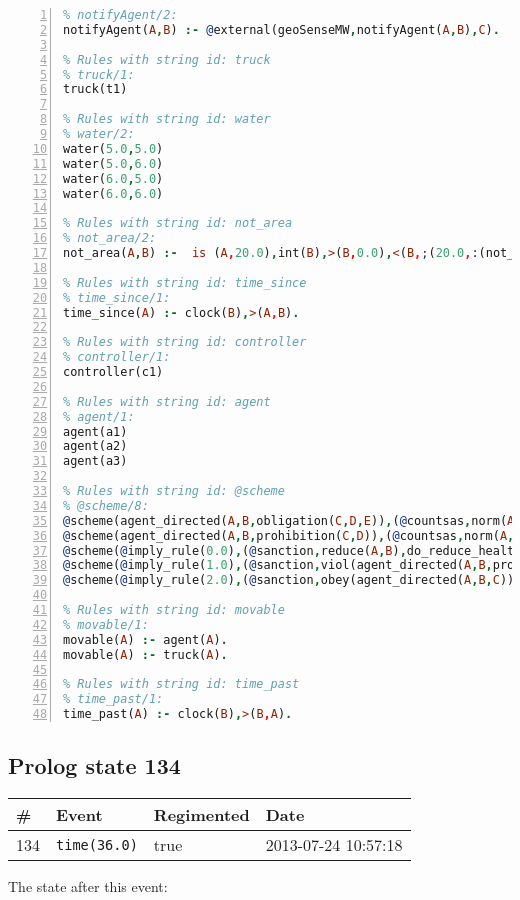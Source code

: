 \documentclass[11pt]{article}\usepackage[utf8]{inputenc}\usepackage{geometry}
\begin{document}
\begin{lstlisting}[language=Prolog, numbers=left]
% Rules with string id: notifyAgent
% notifyAgent/2:
notifyAgent(A,B) :- @external(geoSenseMW,notifyAgent(A,B),C).

% Rules with string id: truck
% truck/1:
truck(t1)

% Rules with string id: water
% water/2:
water(5.0,5.0)
water(5.0,6.0)
water(6.0,5.0)
water(6.0,6.0)

% Rules with string id: not_area
% not_area/2:
not_area(A,B) :-  is (A,20.0),int(B),>(B,0.0),<(B,;(20.0,:(not_area(A,B), is (-(B),20.0)))),int(A),>(A,0.0),<(A,;(20.0,:(area(A,B),-(int(A))))),int(B),>(A,0.0),>(B,0.0),<(A,21.0),<(B,21.0).

% Rules with string id: time_since
% time_since/1:
time_since(A) :- clock(B),>(A,B).

% Rules with string id: controller
% controller/1:
controller(c1)

% Rules with string id: agent
% agent/1:
agent(a1)
agent(a2)
agent(a3)

% Rules with string id: @scheme
% @scheme/8:
@scheme(agent_directed(A,B,obligation(C,D,E)),(@countsas,norm(A,B,F,obligation(C,D,E)),F),false,(listTrue(C)),(time_past(D)),false,[plus(viol(agent_directed(A,B,obligation(C,D,E))))|[]],[plus(obey(agent_directed(A,B,obligation(C,D,E))))|[]])
@scheme(agent_directed(A,B,prohibition(C,D)),(@countsas,norm(A,B,E,prohibition(C,D)),E),(listTrue(C)),false,(false),false,[plus(viol(agent_directed(A,B,prohibition(C,D))))|[]],[plus(obey(agent_directed(A,B,prohibition(C,D))))|[]])
@scheme(@imply_rule(0.0),(@sanction,reduce(A,B),do_reduce_health(A,B),notifyAgent(A,changed(status))),true,false,false,false,[min(reduce(A,B))|[]],[])
@scheme(@imply_rule(1.0),(@sanction,viol(agent_directed(A,B,prohibition(C,D))),do_sanction(D)),true,false,false,false,[min(viol(agent_directed(A,B,prohibition(C,D))))|[]],[])
@scheme(@imply_rule(2.0),(@sanction,obey(agent_directed(A,B,C))),true,false,false,false,[min(obey(agent_directed(A,B,C)))|[]],[])

% Rules with string id: movable
% movable/1:
movable(A) :- agent(A).
movable(A) :- truck(A).

% Rules with string id: time_past
% time_past/1:
time_past(A) :- clock(B),>(B,A).

\end{lstlisting}
\clearpage 
\subsection{Prolog state 134}
\begin{table}[ht]
\centering 
\begin{tabular}{l l l l} 
\textbf{\#} & \textbf{Event} & \textbf{Regimented} & \textbf{Date} \\ [0.5ex] 
\hline
134&\texttt{time(36.0)}&true&2013-07-24 10:57:18\\ [1ex] \hline\end{tabular}
\end{table}
The state after this event:
\end{document}
